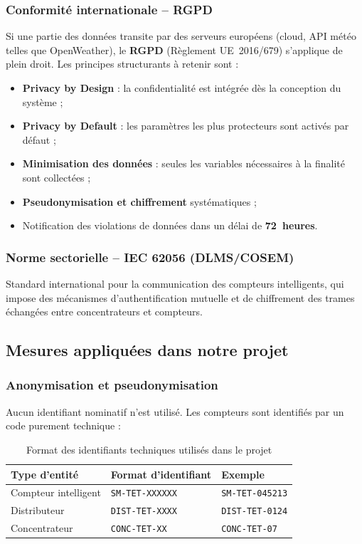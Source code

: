 \documentclass[11pt,a4paper]{article}
\begin{document}
\subsubsection{Conformité internationale -- RGPD}
Si une partie des données transite par des serveurs européens (cloud, API météo telles que OpenWeather), le \textbf{RGPD} (Règlement UE~2016/679) s'applique de plein droit. Les principes structurants à retenir sont :
\begin{itemize}
  \item \textbf{Privacy by Design} : la confidentialité est intégrée dès la conception du système ;
  \item \textbf{Privacy by Default} : les paramètres les plus protecteurs sont activés par défaut ;
  \item \textbf{Minimisation des données} : seules les variables nécessaires à la finalité sont collectées ;
  \item \textbf{Pseudonymisation et chiffrement} systématiques ;
  \item Notification des violations de données dans un délai de \textbf{72~heures}.
\end{itemize}

\subsubsection{Norme sectorielle -- IEC 62056 (DLMS/COSEM)}
Standard international pour la communication des compteurs intelligents, qui impose des mécanismes d'authentification mutuelle et de chiffrement des trames échangées entre concentrateurs et compteurs.

\subsection{Mesures appliquées dans notre projet}

\subsubsection{Anonymisation et pseudonymisation}
Aucun identifiant nominatif n'est utilisé. Les compteurs sont identifiés par un code purement technique :

\begin{table}[h!]
\centering
\begin{tabular}{lll}
\toprule
\rowcolor{lightgray}
\textbf{Type d'entité} & \textbf{Format d'identifiant} & \textbf{Exemple} \\
\midrule
Compteur intelligent & \texttt{SM-TET-XXXXXX} & \texttt{SM-TET-045213} \\
Distributeur & \texttt{DIST-TET-XXXX} & \texttt{DIST-TET-0124} \\
Concentrateur & \texttt{CONC-TET-XX} & \texttt{CONC-TET-07} \\
\bottomrule
\end{tabular}
\caption{Format des identifiants techniques utilisés dans le projet}
\end{table}
\end{document}

